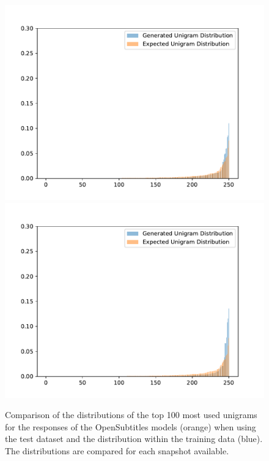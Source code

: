 \begin{figure}[H]
  \includegraphics[width=\linewidth]{img/plots/opensubtitles_not_reversed/unigram_distribution_comparison_step_2500000.pdf}
  \centering
  \small
  \endminipage\hfill
  \includegraphics[width=\linewidth]{img/plots/opensubtitles_not_reversed/unigram_distribution_comparison_step_3000000.pdf}
  \centering
  \small
  \endminipage\hfill
  \caption{Comparison of the distributions of the top 100 most used unigrams for the responses of the OpenSubtitles models (orange) when using the test dataset and the distribution within the training data (blue). The distributions are compared for each snapshot available.}
  \label{results:unigram:distributions:opensubtitles}
\end{figure}

